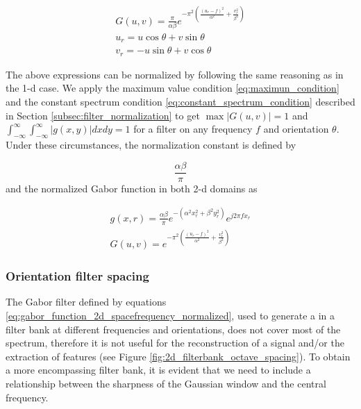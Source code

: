 \begin{equation}\label{eq:gabor_function_2d_frequency_compact}
    \begin{gathered}
        G(u, v) =  \frac{\pi}{\alpha \beta} e ^{- \pi^2 \left(\frac{\left( u_r - f\right)^2}{\alpha^2} + \frac{v_r^2}{\beta^2}\right)} \\
        u_r = u \cos{\theta} + v \sin{\theta}\\
        v_r = -u \sin{\theta} + v \cos{\theta}
     \end{gathered}
\end{equation}

The above expressions can be normalized by following the same reasoning as in the 1-d case. We apply the maximum value condition \eqref{eq:maximun_condition} and the constant spectrum condition \eqref{eq:constant_spectrum_condition} described in Section \ref{subsec:filter_normalization} to get $\max{|G(u,v)|} = 1$ and $\int_{-\infty}^{\infty} \int_{-\infty}^{\infty} |g(x,y)| dx dy = 1$ for a filter on any frequency $f$ and orientation $\theta$. 
Under these circumstances, the normalization constant is defined by

\begin{equation}\label{eq:normalization_constant_2d}
    \frac{\alpha \beta}{\pi}
\end{equation}
and the normalized Gabor function in both 2-d domains as 

\begin{equation}\label{eq:gabor_function_2d_spacefrequency_normalized}
    \begin{gathered}
        g(x, r) = \frac{\alpha \beta}{\pi} e ^{-\left(\alpha^2 x_r^2 + \beta^2 y_r^2\right)} e ^{j 2 \pi f x_r } \\
        G(u, v) =   e ^{- \pi^2 \left(\frac{\left( u_r - f\right)^2}{\alpha^2} + \frac{v_r^2}{\beta^2}\right)} 
     \end{gathered}
\end{equation}

\subsubsection{Orientation filter spacing}

The Gabor filter defined by equations \eqref{eq:gabor_function_2d_spacefrequency_normalized}, used to generate a in a filter bank at different frequencies and orientations, does not cover most of the spectrum, therefore it is not useful for the reconstruction of a signal and/or the extraction of features (see Figure \ref{fig:2d_filterbank_octave_spacing}). To obtain a more encompassing filter bank, it is evident that we need to include a relationship between the sharpness of the Gaussian window and the central frequency. 

